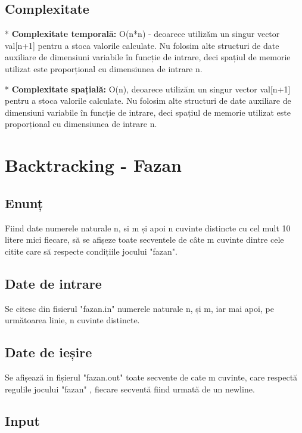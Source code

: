 \documentclass[runningheads]{llncs}
\begin{document}
\subsection{Complexitate}
* { \bfseries Complexitate temporală:} O(n*n)\newline 
  - deoarece utilizăm un singur vector val[n+1] pentru a stoca valorile calculate. Nu folosim alte structuri de date auxiliare de dimensiuni variabile în funcție de intrare, deci spațiul de memorie utilizat este proporțional cu dimensiunea de intrare n.\newline

* {\bfseries Complexitate spațială:} O(n),  deoarece utilizăm un singur vector val[n+1] pentru a stoca valorile calculate. Nu folosim alte structuri de date auxiliare de dimensiuni variabile în funcție de intrare, deci spațiul de memorie utilizat este proporțional cu dimensiunea de intrare n. \newline


\section{Backtracking - Fazan}

\subsection{Enunț}

Fiind date numerele naturale n, si m și apoi n cuvinte distincte cu cel mult 10 litere mici fiecare, să se afișeze toate secventele de câte m cuvinte dintre cele citite care să respecte condițiile jocului "fazan". 
\subsection{Date de intrare}

Se citesc din fisierul "fazan.in" numerele naturale n, și m, iar mai apoi, pe următoarea linie,  n cuvinte distincte.


\subsection{Date de ieșire}

Se afișează in fișierul "fazan.out" toate secvente de cate m cuvinte, care respectă regulile jocului "fazan" , fiecare secventă fiind urmată de un newline.

\subsection{Input}
\end{document}
